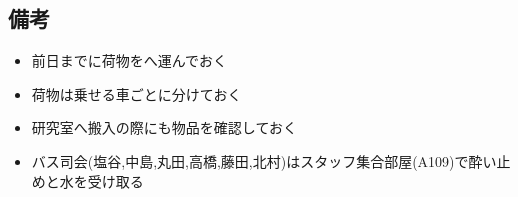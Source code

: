 \subsection{備考}
\begin{itemize}
\item 前日までに荷物をへ運んでおく
\item 荷物は乗せる車ごとに分けておく
\item 研究室へ搬入の際にも物品を確認しておく
\item バス司会(塩谷,中島,丸田,高橋,藤田,北村)はスタッフ集合部屋(A109)で酔い止めと水を受け取る
\end{itemize}


%
